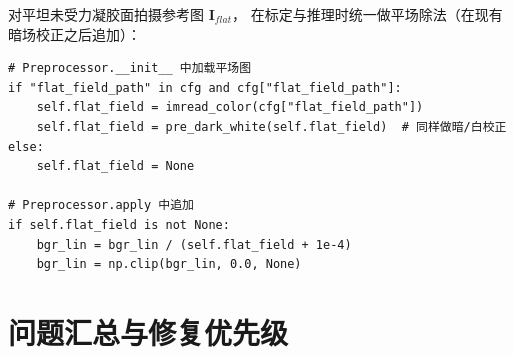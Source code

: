 \documentclass[12pt, a4paper]{ctexart}
\begin{document}
\begin{fixbox}
对平坦未受力凝胶面拍摄参考图 $\mathbf{I}_{flat}$，
在标定与推理时统一做平场除法（在现有暗场校正之后追加）：

\begin{lstlisting}
# Preprocessor.__init__ 中加载平场图
if "flat_field_path" in cfg and cfg["flat_field_path"]:
    self.flat_field = imread_color(cfg["flat_field_path"])
    self.flat_field = pre_dark_white(self.flat_field)  # 同样做暗/白校正
else:
    self.flat_field = None

# Preprocessor.apply 中追加
if self.flat_field is not None:
    bgr_lin = bgr_lin / (self.flat_field + 1e-4)
    bgr_lin = np.clip(bgr_lin, 0.0, None)
\end{lstlisting}
\end{fixbox}

\section{问题汇总与修复优先级}
\label{sec:summary}
\end{document}
